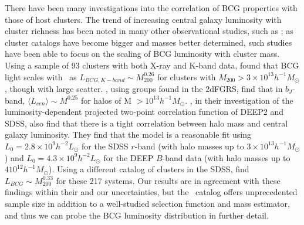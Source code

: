 \documentclass{emulateapj}
\begin{document}
There have been many investigations into the correlation of BCG
properties with those of host clusters. The trend of increasing
central galaxy luminosity with cluster richness has been noted in many
other observational studies, such as \citet{Sandage73,Sandage76,Hoe80,Sch83};
as cluster catalogs have become bigger and masses better determined,
such studies have been able to focus on the scaling of BCG luminosity
with cluster mass. Using a sample of 93 clusters with both X-ray and
K-band data, \citet{LinMohr04} found that BCG light scales with \Mtwo\
as $L_{BCG,K-band} \sim M_{200}^{0.26}$ for clusters with $M_{200} >
3 \times 10^{13} h^{-1} M_{\odot}$, though with large scatter.
\citet{Yang05}, using groups found in the 2dFGRS, find that in
$b_J$-band, $\langle L_{cen} \rangle \sim M^{0.25}$ for halos of M $>
10^{13}h^{-1}M_{\odot}$. \citet{ZCZ07}, in their investigation of the
luminosity-dependent projected two-point correlation function of DEEP2
and SDSS, also find that there is a tight correlation between halo
mass and central galaxy luminosity. They find that the \citet{VO06}
model is a reasonable fit using $L_0=2.8 \times 10^9 h^{-2} L_{\odot}$ for the SDSS $r$-band
(with halo masses up to $3 \times 10^{13} h^{-1} M_{\odot}$) and $L_0=4.3 \times 10^9 h^{-2} L_{\odot}$
for the DEEP $B$-band data (with halo masses up to $4 10^{12} h^{-1}
M_{\odot}$). Using a different catalog of clusters in the SDSS,
\citet{PopessoMLHOD} find $L_{BCG} \sim M_{200}^{0.33}$ for these
217 systems. Our results are in agreement with these findings within their and our uncertainties, but the
\maxbcg\ catalog offers unprecedented sample size in addition to a
well-studied selection function and mass estimator, and thus we can
probe the BCG luminosity distribution in further detail.


\begin{figure}
   
\end{figure}
\end{document}
